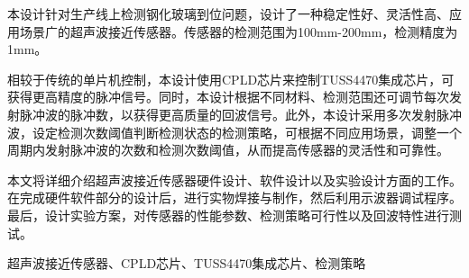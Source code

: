 \begin{ZhAbstract}
    本设计针对生产线上检测钢化玻璃到位问题，设计了一种稳定性好、灵活性高、应用场景广的超声波接近传感器。传感器的检测范围为100mm-200mm，检测精度为1mm。\par
    相较于传统的单片机控制，本设计使用CPLD芯片来控制TUSS4470集成芯片，可获得更高精度的脉冲信号。同时，本设计根据不同材料、检测范围还可调节每次发射脉冲波的脉冲数，以获得更高质量的回波信号。此外，本设计采用多次发射脉冲波，设定检测次数阈值判断检测状态的检测策略，可根据不同应用场景，调整一个周期内发射脉冲波的次数和检测次数阈值，从而提高传感器的灵活性和可靠性。\par
    
    本文将详细介绍超声波接近传感器硬件设计、软件设计以及实验设计方面的工作。在完成硬件软件部分的设计后，进行实物焊接与制作，然后利用示波器调试程序。最后，设计实验方案，对传感器的性能参数、检测策略可行性以及回波特性进行测试。    
    
    \ChineseKeyWord 超声波接近传感器、CPLD芯片、TUSS4470集成芯片、检测策略
    
\end{ZhAbstract}